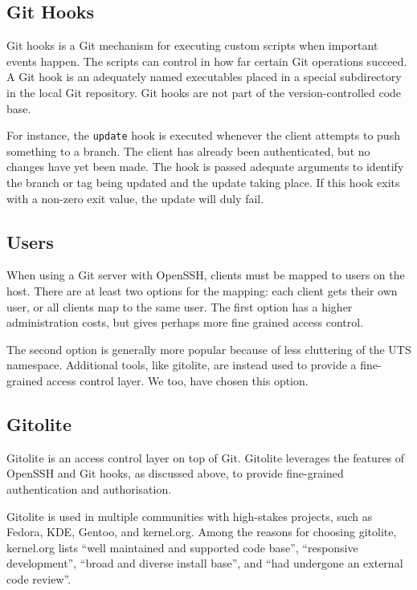 \subsection{Git Hooks}

Git hooks is a Git mechanism for executing custom scripts when important events
happen\cite{man-5-githooks}. The scripts can control in how far certain Git
operations succeed. A Git hook is an adequately named executables placed in a
special subdirectory in the local Git repository. Git hooks are not part of the
version-controlled code base.

For instance, the \texttt{update} hook is executed whenever the client attempts
to push something to a branch. The client has already been authenticated, but
no changes have yet been made. The hook is passed adequate arguments to
identify the branch or tag being updated and the update taking place. If this
hook exits with a non-zero exit value, the update will duly fail.

\subsection{Users}

When using a Git server with OpenSSH, clients must be mapped to users on the
host. There are at least two options for the mapping: each client gets their
own user, or all clients map to the same user. The first option has a higher
administration costs, but gives perhaps more fine grained access control.

The second option is generally more popular because of less cluttering of the
UTS namespace. Additional tools, like gitolite, are instead used to provide a
fine-grained access control layer. We too, have chosen this option.

\subsection{Gitolite}

Gitolite is an access control layer on top of Git\cite{gitolite-com-2014a}.
Gitolite leverages the features of OpenSSH and Git hooks, as discussed above,
to provide fine-grained authentication and
authorisation\cite{gitolite-com-2014b}.

Gitolite is used in multiple communities with high-stakes projects, such as
Fedora, KDE, Gentoo, and kernel.org\cite{gitolite-com-2014c}. Among the reasons
for choosing gitolite, kernel.org lists\cite{kernel-org-2014} ``well maintained
and supported code base'', ``responsive development'', ``broad and diverse
install base'', and ``had undergone an external code
review''\cite{gitolite-google-group-2011}.

